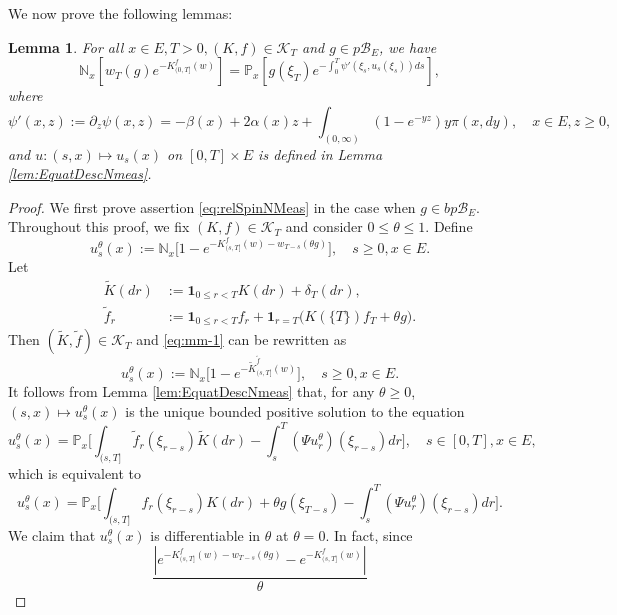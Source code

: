 \documentclass[UTF8]{pkuthss}
\theoremstyle{plain}
\newtheorem{lem}[thm]{Lemma}
\theoremstyle{definition}
\numberwithin{equation}{section}
\begin{document}
We now prove the following lemmas:
\begin{lem}\label{lem:relSpinNMeas}
	For all $x\in E, T>0, (K,f) \in \mathcal K_T$ and $g \in p\mathscr B_E$, we have
\begin{equation}\label{eq:relSpinNMeas}
	\mathbb N_x[w_T(g) e^{-K_{(0, T]}^f(w)}]
	= \mathbb P_x[g(\xi_T) e^{-\int_0^T \psi'(\xi_s,u_s(\xi_s)) ds}],
\end{equation}
	where
\[
	\psi'(x,z)
	:= \partial_z \psi(x,z)
	= - \beta(x) + 2 \alpha(x) z + \int_{(0,\infty)} (1 - e^{-yz}) y \pi(x,dy),
	\quad x \in E, z \geq 0,
\]
	and $u: (s,x) \mapsto u_s(x)$ on $[0,T] \times E$ is defined in Lemma \ref{lem:EquatDescNmeas}.
\end{lem}
\begin{proof}
	We first prove assertion \eqref{eq:relSpinNMeas} in the case when $g \in bp\mathscr B_E$.
	Throughout this proof, we fix $(K,f) \in \mathcal K_T$ and consider $0 \leq \theta \leq 1$.
	Define
\begin{equation}\label{eq:mm-1}
	u_s^\theta(x)
	:=	\mathbb N_x \big[ 1 - e^{ - K_{(s, T]}^f(w) - w_{T-s}(\theta g)} \big],
	\quad s \geq 0, x\in E.
\end{equation}
	Let
\[\begin{split}
	\tilde K(dr)
	&:=	\mathbf 1_{0\leq r<T} K(dr) + \delta_T (dr), \\
	\tilde f_r
	&:=	\mathbf 1_{0\leq r<T} f_r + \mathbf 1_{r=T} \big( K(\{T\}) f_T + \theta g \big).
\end{split}\]
	Then $(\tilde K, \tilde f) \in \mathcal K_T$ and \eqref{eq:mm-1} can be rewritten as
\[
	u_s^\theta(x)
	:=	\mathbb N_x \big[ 1 - e^{ - \tilde K_{(s, T]}^{\tilde f} (w)} \big],
	\quad s \geq 0, x\in E.
\]
	It follows from Lemma \ref{lem:EquatDescNmeas} that, for any
$\theta \geq 0$, $(s,x) \mapsto u^\theta_s(x)$ is the unique bounded positive solution to the equation
\[	
	u_s^\theta(x)
	=\mathbb P_{x} \Big[ \int_{(s,T]} \tilde f_r(\xi_{r-s}) \tilde K(dr) - \int_s^T (\Psi u_r^\theta)(\xi_{r-s}) dr \Big],
	\quad s\in [0,T],x\in E,
\]
	which is equivalent to
\begin{equation}
\label{eq:mewth}
	u_s^\theta(x)
    = \mathbb P_{x} \Big[\int_{(s,T]} f_r(\xi_{r-s}) K(dr) + \theta g(\xi_{T-s}) - \int_s^T (\Psi u^\theta_r)(\xi_{r-s})dr\Big].
\end{equation}
	We claim that $u_s^\theta(x)$ is differentiable in $\theta$ at $\theta = 0$.
	In fact, since
\begin{equation}\label{eq:sbN-1}
	\frac {|e^{-K_{(s, T]}^f(w)-w_{T-s}(\theta g)} - e^{-K_{(s, T]}^f(w)}|} {\theta}

\end{equation}
\end{proof}
\end{document}
